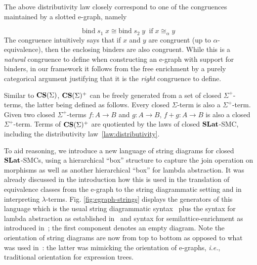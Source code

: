 \begin{remark}

The above distributivity law closely correspond to one of the congruences maintained by a slotted e-graph, namely

\[
\text{bind}\;s_1\; x \cong \text{bind}\;s_2\;y \;\; \text{if}\; x \cong_{\alpha} y
\]
The congruence intuitively says that if $x$ and $y$ are congruent (up to $\alpha$-equivalence), then the enclosing binders are also congruent.
While this is a \textit{natural} congruence to define when constructing an e-graph with support for binders, in our framework it follows from the free enrichment by a purely categorical argument justifying that it is the \textit{right} congruence to define.
\end{remark}

Similar to $\mathbf{CS}(\Sigma)$, $\mathbf{CS}(\Sigma)^{+}$ can be freely generated from a set of closed $\Sigma^{+}$-terms, the latter being defined as follows.
Every closed $\Sigma$-term is also a $\Sigma^{+}$-term. 
Given two closed $\Sigma^{+}$-terms $f : A \to B$ and $g : A \to B$, $f + g : A \to B$ is also a closed $\Sigma^{+}$-term.
Terms of $\mathbf{CS}(\Sigma)^{+}$ are quotiented by the laws of closed $\mathbf{SLat}$-SMC, including the distributivity law~\ref{law:distributivity}.


To aid reasoning, we introduce a new language of string diagrams for closed $\mathbf{SLat}$-SMCs, using a hierarchical ``box'' structure to capture the join operation on morphisms as well as another hierarchical ``box'' for lambda abstraction.
It was already discussed in the introduction how this is  used in the translation of equivalence classes from the e-graph to the string diagrammatic setting and in interpreting $\lambda$-terms.
Fig. \ref{fig:egraph-strings} displays the generators of this language which is the usual string diagrammatic syntax~\cite{Selinger_2010} plus the syntax for lambda abstraction as established in~\cite{ghica2024stringdiagramslambdacalculifunctional} and syntax for semilattice-enrichment as introduced in~\cite{ghica2024equivalencehypergraphsegraphsmonoidal}; the first component denotes an empty diagram.
Note the orientation of string diagrams are now from top to bottom as opposed to what was used in~: the latter was mimicking the orientation of e-graphs, \textit{i.e.}, traditional orientation for expression trees.

